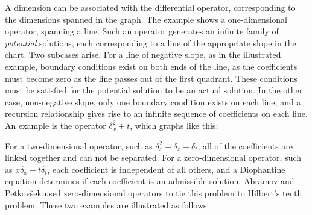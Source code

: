 \documentclass{article}
\begin{document}
A dimension can be associated with the differential operator,
corresponding to the dimensions spanned in the graph.  The example
shows a one-dimensional operator, spanning a line.  Such an operator
generates an infinite family of {\it potential} solutions, each
corresponding to a line of the appropriate slope in the chart.  Two
subcases arise.  For a line of negative slope, as in the illustrated
example, boundary conditions exist on both ends of the line, as the
coefficients must become zero as the line passes out of the first
quadrant.  These conditions must be satisfied for the potential
solution to be an actual solution.  In the other case, non-negative
slope, only one boundary condition exists on each line, and a
recursion relationship gives rise to an infinite sequence of
coefficients on each line.  An example is the operator $\delta_x^2+t$,
which graphs like this:

\begin{center}
\end{center}


For a two-dimensional operator, such as $\delta_x^2+\delta_x-\delta_t$,
all of the coefficients are linked together and can not be separated.
For a zero-dimensional operator, such as $x\delta_x + t\delta_t$,
each coefficient is independent of all others, and a Diophantine
equation determines if each coefficient is an admissible solution.
Abramov and Petkov\v sek used zero-dimensional operators to tie
this problem to Hilbert's tenth problem.
These two examples are illustrated as follows:

\begin{center}
\end{center}
\end{document}
